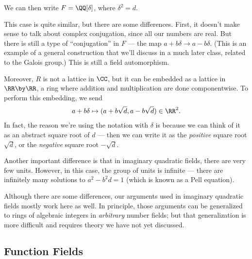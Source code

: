 We can then write $F = \QQ[\delta]$, where $\delta^2 = d$. 

This case is quite similar, but there are some differences. First, it doesn't make sense to talk about complex conjugation, since all our numbers are real. But there is still a type of ``conjugation'' in $F$ --- the map $a + b\delta \to a - b\delta$. (This is an example of a general construction that we'll discuss in a much later class, related to the Galois group.) This is still a field automorphism. 


Moreover, $R$ is not a lattice in $\CC$, but it can be embedded as a lattice in $\RR \by \RR$, a ring where addition and multiplication are done componentwise. To perform this embedding, we send \[a + b\delta \mapsto (a + b\sqrt{d}, a - b\sqrt{d}) \in \RR^2.\] In fact, the reason we're using the notation with $\delta$ is because we can think of it as an abstract square root of $d$ --- then we can write it as the \emph{positive} square root $\sqrt{d}$, or the \emph{negative} square root $-\sqrt{d}$. %

Another important difference is that in imaginary quadratic fields, there are very few units. However, in this case, the group of units is infinite --- there are infinitely many solutions to $a^2 - b^2d = 1$ (which is known as a Pell equation). 

Although there are some differences, our arguments used in imaginary quadratic fields mostly work here as well. In principle, those arguments can be generalized to rings of algebraic integers in \emph{arbitrary} number fields; but that generalization is more difficult and requires theory we have not yet discussed.

\subsection{Function Fields}

